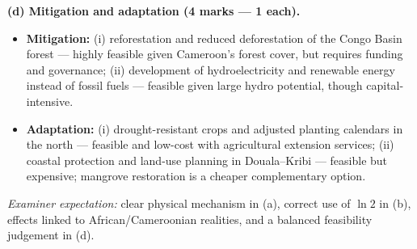 \documentclass[11pt]{article}
\begin{document}
\begin{corrige}
\textbf{(d) Mitigation and adaptation (4 marks — 1 each).}
\begin{itemize}
\item \textbf{Mitigation:} (i) reforestation and reduced deforestation of the Congo Basin forest — highly feasible given Cameroon's forest cover, but requires funding and governance; (ii) development of hydroelectricity and renewable energy instead of fossil fuels — feasible given large hydro potential, though capital-intensive.
\item \textbf{Adaptation:} (i) drought-resistant crops and adjusted planting calendars in the north — feasible and low-cost with agricultural extension services; (ii) coastal protection and land-use planning in Douala–Kribi — feasible but expensive; mangrove restoration is a cheaper complementary option.
\end{itemize}
\emph{Examiner expectation:} clear physical mechanism in (a), correct use of $\ln 2$ in (b), effects linked to African/Cameroonian realities, and a balanced feasibility judgement in (d).
\end{corrige}
\end{document}
